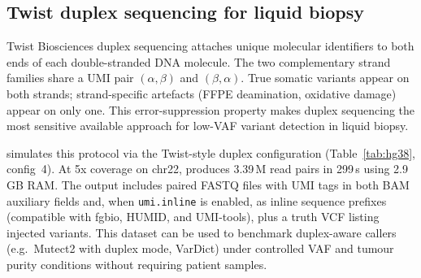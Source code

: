 \begin{table}[t]
\centering
\caption{hg38 chr22 benchmarks (1 run each with fixed seed, 12 threads). Fixed seed produces deterministic output. Config~7: 30x WGS; Config~8: 1\,Mbp BED target at 200x.}
\label{tab:hg38}
\small
\setlength{\tabcolsep}{3.5pt}
\end{table}

\subsection{Twist duplex sequencing for liquid biopsy}
\label{sec:twist}

Twist Biosciences duplex sequencing attaches unique molecular identifiers to both ends of each double-stranded DNA molecule.
The two complementary strand families share a UMI pair $(\alpha,\beta)$ and $(\beta,\alpha)$.
True somatic variants appear on both strands; strand-specific artefacts (FFPE deamination, oxidative damage) appear on only one.
This error-suppression property makes duplex sequencing the most sensitive available approach for low-VAF variant detection in liquid biopsy.

\varforge{} simulates this protocol via the Twist-style duplex configuration (Table~\ref{tab:hg38}, config~4).
At 5x coverage on chr22, \varforge{} produces 3.39\,M read pairs in 299\,s using 2.9\,GB RAM.
The output includes paired FASTQ files with UMI tags in both BAM auxiliary fields and, when \texttt{umi.inline} is enabled, as inline sequence prefixes (compatible with fgbio, HUMID, and UMI-tools), plus a truth VCF listing injected variants.
This dataset can be used to benchmark duplex-aware callers (e.g.\ Mutect2 with duplex mode, VarDict) under controlled VAF and tumour purity conditions without requiring patient samples.

